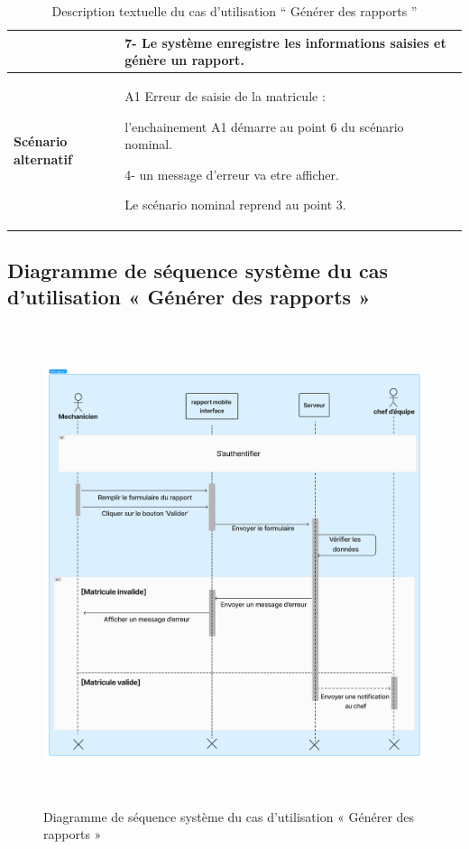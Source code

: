 \begin{table}[H]
    \centering
    \renewcommand{\arraystretch}{0.9}
    \begin{tabular}{|p{4cm}|p{9cm}|}



                                     & 7- Le système enregistre les informations saisies et génère un rapport. \\

        \hline
        \textbf{Scénario alternatif} & A1 Erreur de saisie de la matricule :\newline

        l'enchainement A1 démarre au point 6 du scénario nominal.\newline

        4- un message d'erreur va etre afficher. \newline

        Le scénario nominal reprend au point 3.                                                                \\

        \hline
    \end{tabular}
    \caption{Description textuelle du cas d’utilisation “ Générer des rapports ”}

\end{table}

\subsection{Diagramme de séquence système du cas d’utilisation « Générer des rapports »}

\begin{figure}[h!]
    \centering
    \includegraphics[width=1\textwidth,height=14cm]{chap5.images/dss rapport.png}
    \caption{Diagramme de séquence système du cas d’utilisation « Générer des rapports »}

\end{figure}


